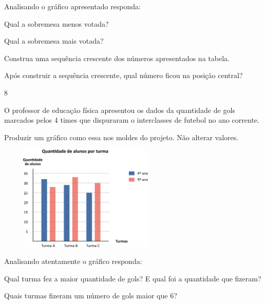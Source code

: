 \begin{escolha}
Analisando o gráfico apresentado responda:

\begin{escolha}

\item
  Qual a sobremesa menos votada?

\item
  Qual a sobremesa mais votada?

\item
  Construa uma sequência crescente dos números apresentados na tabela.

\item
  Após construir a sequência crescente, qual número ficou na posição
  central?
\end{escolha}

\num{8}

O professor de educação física apresentou os dados da quantidade de gols
marcados pelos 4 times que dispuraram o interclasses de futebol no ano
corrente.

Produzir um gráfico como essa nos moldes do projeto. Não alterar
valores.

\includegraphics[width=3.30769in,height=1.97201in]{media/image97.png}

Analisando atentamente o gráfico responda:

\begin{escolha}

\item
  Qual turma fez a maior quantidade de gols? E qual foi a quantidade que
  fizeram?

\item
  Quais turmas fizeram um número de gols maior que 6?


\end{escolha}
\end{escolha}

